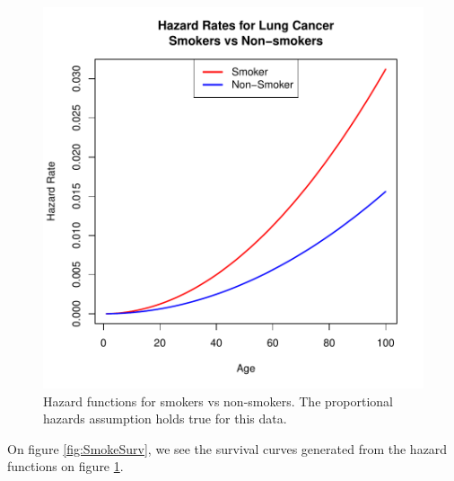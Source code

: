 \documentclass[a4paper]{article}
\begin{document}
\begin{figure}[H]
\begin{center}
\includegraphics{StatisticalBackground-008}
\caption{Hazard functions for smokers vs non-smokers. The proportional hazards assumption holds true for this data.}
\label{fig:SmokeHaz}
\end{center}
\end{figure}

On figure \ref{fig:SmokeSurv}, we see the survival curves generated from the hazard functions on figure \ref{fig:SmokeHaz}.
\end{document}
